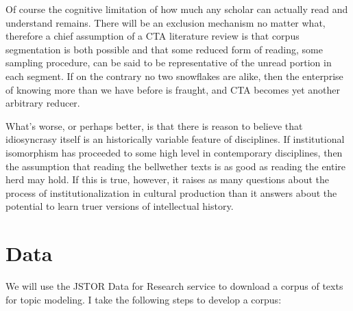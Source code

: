 \documentclass[]{book}
\theoremstyle{definition}
\theoremstyle{definition}
\theoremstyle{definition}
\theoremstyle{remark}
\begin{document}
Of course the cognitive limitation of how much any scholar can actually
read and understand remains. There will be an exclusion mechanism no
matter what, therefore a chief assumption of a CTA literature review is
that corpus segmentation is both possible and that some reduced form of
reading, some sampling procedure, can be said to be representative of
the unread portion in each segment. If on the contrary no two snowflakes
are alike, then the enterprise of knowing more than we have before is
fraught, and CTA becomes yet another arbitrary reducer.

What's worse, or perhaps better, is that there is reason to believe that
idiosyncrasy itself is an historically variable feature of disciplines.
If institutional isomorphism has proceeded to some high level in
contemporary disciplines, then the assumption that reading the
bellwether texts is as good as reading the entire herd may hold. If this
is true, however, it raises as many questions about the process of
institutionalization in cultural production than it answers about the
potential to learn truer versions of intellectual history.

\hypertarget{data}{%
\section{Data}\label{data}}

We will use the JSTOR Data for Research service to download a corpus of
texts for topic modeling. I take the following steps to develop a
corpus:
\end{document}
